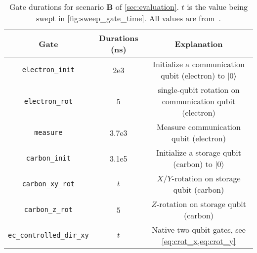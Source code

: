 \begin{table}
  \centering
  \begin{tabular}{|c|c|c|}
    \hline
    Gate                      & Durations (ns) & Explanation                                                \\
    \hline\hline
    \texttt{electron\_init}        & 2e3            & Initialize a communication qubit (electron) to $|0\rangle$ \\
    \texttt{electron\_rot}         & 5              & single-qubit rotation on communication qubit (electron)    \\
    \texttt{measure}              & 3.7e3          & Measure communication qubit (electron)                     \\
    \texttt{carbon\_init}          & 3.1e5          & Initialize a storage qubit (carbon) to $|0\rangle$         \\
    \texttt{carbon\_xy\_rot}        & $t$            & $X$/$Y$-rotation on storage qubit (carbon)                 \\
    \texttt{carbon\_z\_rot}         & 5              & $Z$-rotation on storage qubit (carbon)                     \\
    \texttt{ec\_controlled\_dir\_xy} & $t$            & Native two-qubit gates, see \cref{eq:crot_x,eq:crot_y}     \\
    \hline
  \end{tabular}
  \caption{
    Gate durations for scenario \textbf{B} of \cref{sec:evaluation}.
    $t$ is the value being swept in \cref{fig:sweep_gate_time}.
    All values are from~\cite{dahlberg2019linklayer}.}
  \label{tab:gates}
\end{table}


